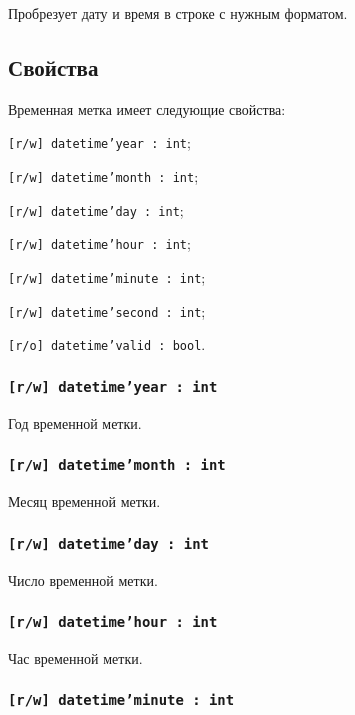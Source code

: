 Пробрезует дату и время в строке с нужным форматом.

\subsection{Свойства}

Временная метка имеет следующие свойства:
\begin{icItems}
	\item \texttt{[r/w] datetime'year : int};
	\item \texttt{[r/w] datetime'month : int};
	\item \texttt{[r/w] datetime'day : int};
	\item \texttt{[r/w] datetime'hour : int};
	\item \texttt{[r/w] datetime'minute : int};
	\item \texttt{[r/w] datetime'second : int};
	\item \texttt{[r/o] datetime'valid : bool}.
\end{icItems}

\subsubsection{\texttt{[r/w] datetime'year : int}}

Год временной метки.

\subsubsection{\texttt{[r/w] datetime'month : int}}

Месяц временной метки.

\subsubsection{\texttt{[r/w] datetime'day : int}}

Число временной метки.

\subsubsection{\texttt{[r/w] datetime'hour : int}}

Час временной метки.

\subsubsection{\texttt{[r/w] datetime'minute : int}}

